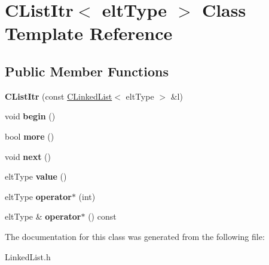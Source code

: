 \hypertarget{classCListItr}{\section{C\-List\-Itr$<$ elt\-Type $>$ Class Template Reference}
\label{classCListItr}
}
\subsection*{Public Member Functions}
\begin{DoxyCompactItemize}
\item 
\hypertarget{classCListItr_a4d8ba7aaff5fc47b863193e286c00a33}{{\bfseries C\-List\-Itr} (const \hyperlink{classCLinkedList}{C\-Linked\-List}$<$ elt\-Type $>$ \&l)}\label{classCListItr_a4d8ba7aaff5fc47b863193e286c00a33}

\item 
\hypertarget{classCListItr_a486df8368931ef901449c8ba7fbacd63}{void {\bfseries begin} ()}\label{classCListItr_a486df8368931ef901449c8ba7fbacd63}

\item 
\hypertarget{classCListItr_abb733dd2e6468776859a1b350fd0bb55}{bool {\bfseries more} ()}\label{classCListItr_abb733dd2e6468776859a1b350fd0bb55}

\item 
\hypertarget{classCListItr_a3697bb3409c4f92b7ca35bef8aac8cf5}{void {\bfseries next} ()}\label{classCListItr_a3697bb3409c4f92b7ca35bef8aac8cf5}

\item 
\hypertarget{classCListItr_a90a584ec249071f746acfb72c82059cb}{elt\-Type {\bfseries value} ()}\label{classCListItr_a90a584ec249071f746acfb72c82059cb}

\item 
\hypertarget{classCListItr_ab78763162a060221c6c77ab81fc83230}{elt\-Type {\bfseries operator$\ast$} (int)}\label{classCListItr_ab78763162a060221c6c77ab81fc83230}

\item 
\hypertarget{classCListItr_a93fadad57482ebab949eede2a439420e}{elt\-Type \& {\bfseries operator$\ast$} () const }\label{classCListItr_a93fadad57482ebab949eede2a439420e}

\end{DoxyCompactItemize}


The documentation for this class was generated from the following file\-:\begin{DoxyCompactItemize}
\item 
Linked\-List.\-h\end{DoxyCompactItemize}
